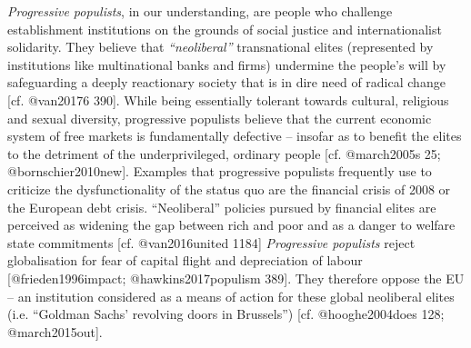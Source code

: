 \documentclass[]{article}
\begin{document}
\emph{Progressive populists}, in our understanding, are people who
challenge establishment institutions on the grounds of social justice
and internationalist solidarity. They believe that \emph{``neoliberal''}
transnational elites (represented by institutions like multinational
banks and firms) undermine the people's will by safeguarding a deeply
reactionary society that is in dire need of radical change {[}cf.
@van20176 390{]}. While being essentially tolerant towards cultural,
religious and sexual diversity, progressive populists believe that the
current economic system of free markets is fundamentally defective --
insofar as to benefit the elites to the detriment of the
underprivileged, ordinary people {[}cf. @march2005s 25;
@bornschier2010new{]}. Examples that progressive populists frequently
use to criticize the dysfunctionality of the status quo are the
financial crisis of 2008 or the European debt crisis. ``Neoliberal''
policies pursued by financial elites are perceived as widening the gap
between rich and poor and as a danger to welfare state commitments
{[}cf. @van2016united 1184{]} \emph{Progressive populists} reject
globalisation for fear of capital flight and depreciation of labour
{[}@frieden1996impact; @hawkins2017populism 389{]}. They therefore
oppose the EU -- an institution considered as a means of action for
these global neoliberal elites (i.e. ``Goldman Sachs' revolving doors in
Brussels'') {[}cf. @hooghe2004does 128; @march2015out{]}.
\end{document}

